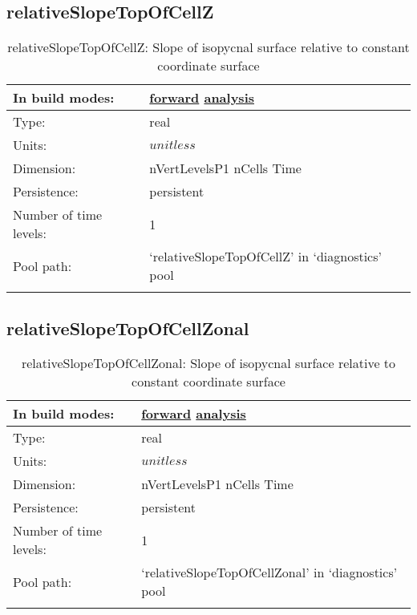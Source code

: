 \subsection[relativeSlopeTopOfCellZ]{relativeSlopeTopOfCellZ}
\label{subsec:var_sec_diagnostics_relativeSlopeTopOfCellZ}
\begin{center}
\begin{longtable}{| p{2.0in} | p{4.0in} |}
        \hline 
        In build modes: & \hyperref[subsec:forward_var_tab_diagnostics]{forward} \hyperref[subsec:analysis_var_tab_diagnostics]{analysis} \\
        \hline 
        Type: & real \\
        \hline 
        Units: & $unitless$ \\
        \hline 
        Dimension: & nVertLevelsP1 nCells Time \\
        \hline 
        Persistence: & persistent \\
        \hline 
        Number of time levels: & 1 \\
        \hline 
            Pool path: & `relativeSlopeTopOfCellZ' in `diagnostics' pool \\
		 \hline 
    \caption{relativeSlopeTopOfCellZ: Slope of isopycnal surface relative to constant coordinate surface}
\end{longtable}
\end{center}
\subsection[relativeSlopeTopOfCellZonal]{relativeSlopeTopOfCellZonal}
\label{subsec:var_sec_diagnostics_relativeSlopeTopOfCellZonal}
\begin{center}
\begin{longtable}{| p{2.0in} | p{4.0in} |}
        \hline 
        In build modes: & \hyperref[subsec:forward_var_tab_diagnostics]{forward} \hyperref[subsec:analysis_var_tab_diagnostics]{analysis} \\
        \hline 
        Type: & real \\
        \hline 
        Units: & $unitless$ \\
        \hline 
        Dimension: & nVertLevelsP1 nCells Time \\
        \hline 
        Persistence: & persistent \\
        \hline 
        Number of time levels: & 1 \\
        \hline 
            Pool path: & `relativeSlopeTopOfCellZonal' in `diagnostics' pool \\
		 \hline 
    \caption{relativeSlopeTopOfCellZonal: Slope of isopycnal surface relative to constant coordinate surface}
\end{longtable}
\end{center}
